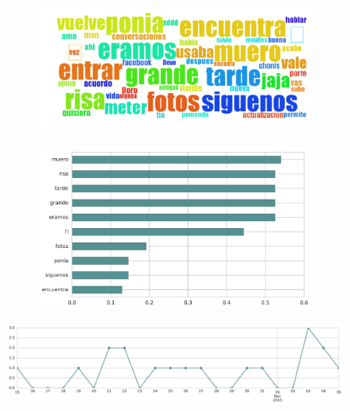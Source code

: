 \begin{figure}[htbp!]
    \centering
    \begin{subfigure}[b]{0.49\textwidth}
        \includegraphics[width=\textwidth]{twitter_murcia/report_images/topic-09-wordcloud.jpg}
    \end{subfigure}
    \begin{subfigure}[b]{0.49\textwidth}
        \includegraphics[width=\textwidth]{twitter_murcia/report_images/topic-09-terms.jpg}
    \end{subfigure}
\end{figure}

\begin{figure}[htbp!]
    \centering
    \includegraphics[width=\textwidth]{twitter_murcia/report_images/topic-09-timeseries.jpg}
\end{figure}

